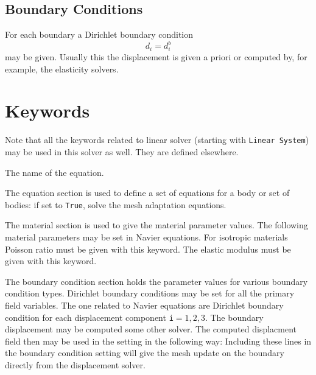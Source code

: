 \begin{versiona}
\subsection{Boundary Conditions}

For each boundary a Dirichlet boundary condition
\begin{equation}
d_i = d_i^b
\end{equation}
may be given. Usually this the displacement is given a priori or computed
by, for example, the elasticity solvers.

\section{Keywords} 
\end{versiona}

\sifbegin

Note that all the keywords related to linear solver (starting
with {\tt Linear System})
may be used in this solver as well.  They are defined elsewhere. 

\sifbegin
{} 
The name of the equation.
\sifend

The equation section is used to define a set of equations for a body or set of bodies:
\sifbegin
{} if set to {\tt True}, solve the mesh adaptation equations.
\sifend

The material section is used to give the material parameter values. The
following material parameters may be set in Navier equations.
\sifbegin
{} 
For isotropic materials Poisson ratio must be given with this keyword.
 The elastic modulus must be given with this
keyword.
\sifend


The boundary condition section holds the parameter values for various
boundary condition types. Dirichlet boundary conditions may be
set for all the primary field variables. The one related to Navier equations
are
\sifbegin
{} 
Dirichlet boundary condition
for each displacement component {\tt i}$=1,2,3$.
The boundary displacement may be computed some other solver. The computed
displacment field then may be used in the setting in the following way:
Including these lines in the boundary condition setting will give
the mesh update on the boundary directly from the displacement solver.
\sifend
\sifend


